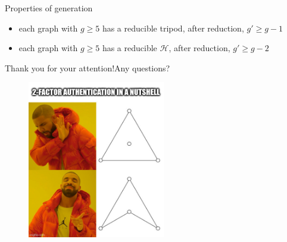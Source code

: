 \documentclass{beamer}
\begin{document}
\begin{frame}{Properties of generation}
	\begin{itemize}
		\item each graph with $g\geq 5$ has a reducible tripod, after reduction, $g'\geq g-1$
		\item each graph with $g\geq 5$ has a reducible $\mathcal H$, after reduction, $g'\geq g-2$
	\end{itemize}
\end{frame}

\begin{frame}{Thank you for your attention!}{Any questions?}
	\begin{figure}
		\centering
		\includegraphics[width=60mm]{2FA_meme.jpg}
	\end{figure}
		
\end{frame}
\end{document}
